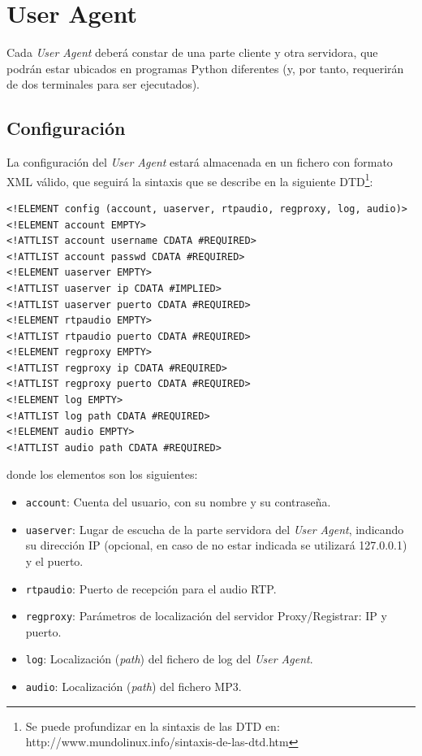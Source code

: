 \documentclass[a4paper,11pt]{article}
\begin{document}
\section{User Agent}

Cada \emph{User Agent} deberá constar de una parte cliente y otra servidora, que podrán estar ubicados en programas Python diferentes (y, por tanto, requerirán de dos terminales para ser ejecutados).

\subsection{Configuración}

La configuración del \emph{User Agent} estará almacenada en un fichero
con formato XML válido, que seguirá 
la sintaxis que se describe en la siguiente DTD\footnote{Se puede profundizar en la sintaxis de las DTD en: http://www.mundolinux.info/sintaxis-de-las-dtd.htm}:

\begin{verbatim}
<!ELEMENT config (account, uaserver, rtpaudio, regproxy, log, audio)>
<!ELEMENT account EMPTY>
<!ATTLIST account username CDATA #REQUIRED>
<!ATTLIST account passwd CDATA #REQUIRED>
<!ELEMENT uaserver EMPTY>
<!ATTLIST uaserver ip CDATA #IMPLIED>
<!ATTLIST uaserver puerto CDATA #REQUIRED>
<!ELEMENT rtpaudio EMPTY>
<!ATTLIST rtpaudio puerto CDATA #REQUIRED>
<!ELEMENT regproxy EMPTY>
<!ATTLIST regproxy ip CDATA #REQUIRED>
<!ATTLIST regproxy puerto CDATA #REQUIRED>
<!ELEMENT log EMPTY>
<!ATTLIST log path CDATA #REQUIRED>
<!ELEMENT audio EMPTY>
<!ATTLIST audio path CDATA #REQUIRED>
\end{verbatim}

donde los elementos son los siguientes:

\begin{itemize}
  \item \texttt{account}: Cuenta del usuario, con su nombre y su contraseña.
  \item \texttt{uaserver}: Lugar de escucha de la parte servidora del \emph{User Agent}, indicando su dirección IP (opcional, en caso de no estar indicada se utilizará 127.0.0.1) y el puerto.
  \item \texttt{rtpaudio}: Puerto de recepción para el audio RTP.
  \item \texttt{regproxy}: Parámetros de localización del servidor Proxy/Registrar: IP y puerto.
  \item \texttt{log}: Localización (\emph{path}) del fichero de log del \emph{User Agent}.
  \item \texttt{audio}: Localización (\emph{path}) del fichero MP3.
\end{itemize}
\end{document}
